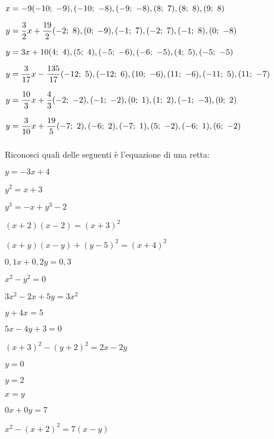 \begin{esercizio}
\begin{enumeratea}
  \item  $x = -9 \hfill (-10;~-9), (-10;~-8), (-9;~-8), (8;~7), (8;~8), (9;~8)$
  \item  $y = \dfrac{3}{2} x +\dfrac{19}{2} 
  \hfill (-2;~8), (0;~-9), (-1;~7), (-2;~7), (-1;~8), (0;~-8)$
  \item  $y = 3 x +10 
  \hfill (4;~4), (5;~4), (-5;~-6), (-6;~-5), (4;~5), (-5;~-5)$
  \item  $y = \dfrac{3}{17} x -\dfrac{135}{17} 
  \hfill (-12;~5), (-12;~6), (10;~-6), (11;~-6), (-11;~5), (11;~-7)$
  \item  $y = \dfrac{10}{3} x +\dfrac{4}{3} 
  \hfill (-2;~-2), (-1;~-2), (0;~1), (1;~2), (-1;~-3), (0;~2)$
  \item  $y = \dfrac{3}{10} x +\dfrac{19}{5} 
  \hfill (-7;~2), (-6;~2), (-7;~1), (5;~-2), (-6;~1), (6;~-2)$
 \end{enumeratea}
\end{esercizio}

\subsubsection*{}

\begin{esercizio}\label{ese:02_01.} %
Riconosci quali delle seguenti è l'equazione di una retta:
\begin{multicols}{2}
 \begin{enumeratea}
  \item  $ y = -3 x +4$
  \item  $ y^2 = x + 3$
  \item  $ y^3 = -x + y^3 -2$
  \item  $ (x +2)(x-2)=(x +3)^2$
  \item  $ (x +y)(x-y) + (y-5)^2 = (x +4)^2$
  \item  $ 0,1 x + 0,2 y = 0,3$
  \item  $ x^2 - y^2 = 0$
  \item  $ 3x^2 - 2x + 5y = 3x^2$
  \item  $ y +4 x = 5$
  \item  $ 5 x -4 y+3 = 0$
  \item  $ (x+3)^2 - (y+2)^2 = 2 x - 2y$
  \item  $ y = 0$
  \item  $ y = 2$
  \item  $ x = y$
  \item  $ 0 x + 0 y = 7$
  \item  $ x^2 -(x+2)^2 = 7 (x -y)$
 \end{enumeratea}
\end{multicols}
\end{esercizio}

